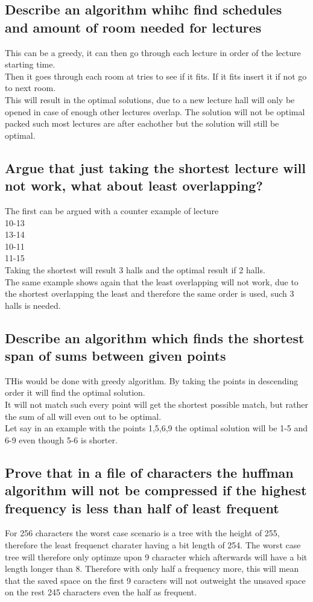\documentclass[12pt, a4paper]{article}
\begin{document}
	\subsection{Describe an algorithm whihc find schedules and amount of room needed for lectures}
		This can be a greedy, it can then go through each lecture in order of the lecture starting time.\\
		Then it goes through each room at tries to see if it fits. If it fits insert it if not go to next room.\\
		This will result in the optimal solutions, due to a new lecture hall will only be opened in case of enough other lectures overlap. The solution will not be optimal packed such most lectures are after eachother but the solution will still be optimal.
	\subsection{Argue that just taking the shortest lecture will not work, what about least overlapping?}
		The first can be argued with a counter example of lecture\\
		10-13\\
		13-14\\
		10-11\\
		11-15\\
		Taking the shortest will result 3 halls and the optimal result if 2 halls.\\
		The same example shows again that the least overlapping will not work, due to the shortest overlapping the least and therefore the same order is used, such 3 halls is needed.
	\subsection{Describe an algorithm which finds the shortest span of sums between given points}
		THis would be done with greedy algorithm. By taking the points in descending order it will find the optimal solution.\\
		It will not match such every point will get the shortest possible match, but rather the sum of all will even out to be optimal.\\
		Let say in an example with the points 1,5,6,9 the optimal solution will be 1-5 and 6-9 even though 5-6 is shorter.
	\subsection{Prove that in a file of characters the huffman algorithm will not be compressed if the highest frequency is less than half of least frequent}
		For 256 characters the worst case scenario is a tree with the height of 255, therefore the least frequenct charater having a bit length of 254. The worst case tree will therefore only optimze upon 9 character which afterwards will have a bit length longer than 8. Therefore with only half a frequency more, this will mean that the saved space on the first 9 caracters will not outweight the unsaved space on the rest 245 characters even the half as frequent.
\end{document}
